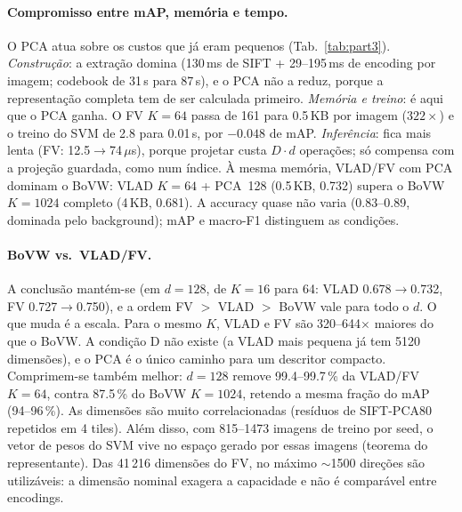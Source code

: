\paragraph{Compromisso entre mAP, memória e tempo.}
O PCA atua sobre os custos que já eram pequenos (Tab.~\ref{tab:part3}).
\emph{Construção}: a extração domina (130\,ms de SIFT + 29--195\,ms de encoding
por imagem; codebook de 31\,s para 87\,s), e o PCA não a reduz, porque a
representação completa tem de ser calculada primeiro. \emph{Memória e treino}:
é aqui que o PCA ganha. O FV $K=64$ passa de 161 para 0.5\,KB por imagem
($322\times$) e o treino do SVM de 2.8 para 0.01\,s, por $-0.048$ de mAP.
\emph{Inferência}: fica mais lenta (FV: 12.5$\to$74\,$\mu$s), porque projetar
custa $D\cdot d$ operações; só compensa com a projeção guardada, como num
índice. À mesma memória, VLAD/FV com PCA dominam o BoVW: VLAD $K=64$ + PCA~128
(0.5\,KB, 0.732) supera o BoVW $K=1024$ completo (4\,KB, 0.681). A accuracy
quase não varia (0.83--0.89, dominada pelo background); mAP e macro-F1
distinguem as condições.

\paragraph{BoVW vs.\ VLAD/FV.}
A conclusão mantém-se (em $d=128$, de $K=16$ para 64: VLAD 0.678$\to$0.732,
FV 0.727$\to$0.750), e a ordem FV $>$ VLAD $>$ BoVW vale para todo o $d$. O que
muda é a escala. Para o mesmo $K$, VLAD e FV são 320--644$\times$ maiores do
que o BoVW. A condição D não existe (a VLAD mais pequena já tem 5120
dimensões), e o PCA é o único caminho para um descritor compacto. Comprimem-se
também melhor: $d=128$ remove 99.4--99.7\,\% da VLAD/FV $K=64$, contra
87.5\,\% do BoVW $K=1024$, retendo a mesma fração do mAP (94--96\,\%). As
dimensões são muito correlacionadas (resíduos de SIFT-PCA80 repetidos em 4
tiles). Além disso, com 815--1473 imagens de treino por seed, o vetor de pesos do
SVM vive no espaço gerado por essas imagens (teorema do representante). Das
41\,216 dimensões do FV, no máximo $\sim$1500 direções são utilizáveis: a
dimensão nominal exagera a capacidade e não é comparável entre encodings.